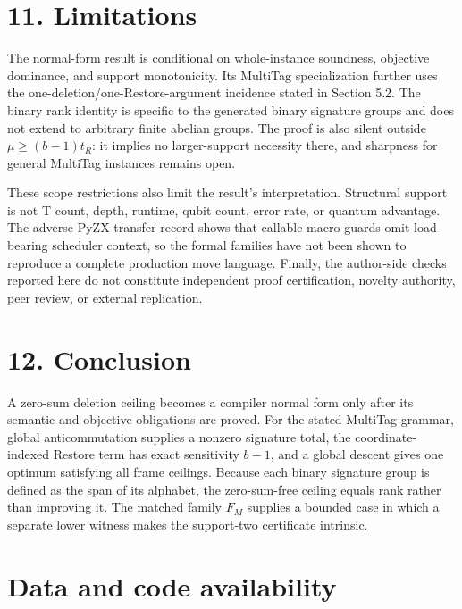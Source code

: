 \documentclass[11pt]{article}
\begin{document}
\hypertarget{limitations}{%
\section*{11. Limitations}\label{limitations}}

The normal-form result is conditional on whole-instance soundness, objective dominance, and support monotonicity. Its MultiTag specialization further uses the one-deletion/one-Restore-argument incidence stated in Section 5.2. The binary rank identity is specific to the generated binary signature groups and does not extend to arbitrary finite abelian groups. The proof is also silent outside \(\mu\geq (b-1)t_R\): it implies no larger-support necessity there, and sharpness for general MultiTag instances remains open.

These scope restrictions also limit the result's interpretation. Structural support is not T count, depth, runtime, qubit count, error rate, or quantum advantage. The adverse PyZX transfer record shows that callable macro guards omit load-bearing scheduler context, so the formal families have not been shown to reproduce a complete production move language. Finally, the author-side checks reported here do not constitute independent proof certification, novelty authority, peer review, or external replication.

\hypertarget{conclusion}{%
\section*{12. Conclusion}\label{conclusion}}

A zero-sum deletion ceiling becomes a compiler normal form only after its semantic and objective obligations are proved. For the stated MultiTag grammar, global anticommutation supplies a nonzero signature total, the coordinate-indexed Restore term has exact sensitivity \(b-1\), and a global descent gives one optimum satisfying all frame ceilings. Because each binary signature group is defined as the span of its alphabet, the zero-sum-free ceiling equals rank rather than improving it. The matched family \(F_M\) supplies a bounded case in which a separate lower witness makes the support-two certificate intrinsic.

\hypertarget{data-and-code-availability}{%
\section*{Data and code availability}\label{data-and-code-availability}}
\end{document}
